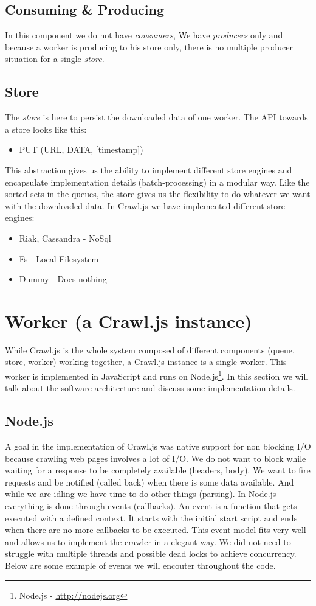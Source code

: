 \subsection{Consuming \& Producing}
In this component we do not have \emph{consumers}, We have \emph{producers} only and because a worker is producing to his store only, there is no multiple producer situation for a single \emph{store}.

\subsection{Store}
The \emph{store} is here to persist the downloaded data of one worker. The API towards a store looks like this:
\begin{itemize}
  \item PUT (URL, DATA, [timestamp])
\end{itemize}
This abstraction gives us the ability to implement different store engines and encapsulate implementation details (batch-processing) in a modular way. Like the sorted sets in the queues, the store gives us the flexibility to do whatever we want with the downloaded data. In Crawl.js we have implemented different store engines:
\begin{itemize}
  \item Riak, Cassandra - NoSql
  \item Fs - Local Filesystem
  \item Dummy - Does nothing
\end{itemize}

\section{Worker (a Crawl.js instance)}
\label{worker}
While Crawl.js is the whole system composed of different components (queue, store, worker) working together, a Crawl.js instance is a single worker. This worker is implemented in JavaScript and runs on Node.js\footnote{Node.js - \url{http://nodejs.org}}.
In this section we will talk about the software architecture and discuss some implementation details.

\subsection{Node.js}
A goal in the implementation of Crawl.js was native support for non blocking I/O because crawling web pages involves a lot of I/O. We do not want to block while waiting for a response to be completely available (headers, body). We want to fire requests and be notified (called back) when there is some data available. And while we are idling we have time to do other things (parsing). In Node.js everything is done through events (callbacks). An event is a function that gets executed with a defined context. It starts with the initial start script and ends when there are no more callbacks to be executed. This event model fits very well and allows us to implement the crawler in a elegant way. We did not need to struggle with multiple threads and possible dead locks to achieve concurrency. Below are some example of events we will encouter throughout the code.

